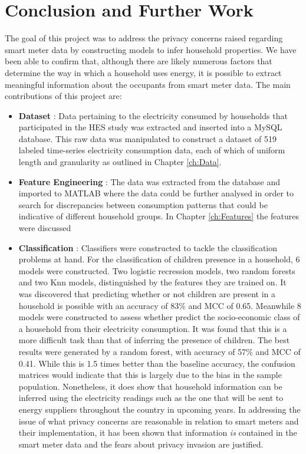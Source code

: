 \chapter{Conclusion and Further Work}

The goal of this project was to address the privacy concerns raised regarding smart meter data by constructing models to infer household properties. We have been able to confirm that, although there are likely numerous factors that determine the way in which a household uses energy, it is possible to extract meaningful information about the occupants from smart meter data. The main contributions of this project are:

\begin{itemize}

\item \textbf{Dataset} : Data pertaining to the electricity consumed by households that participated in the HES study was extracted and inserted into a MySQL database. This raw data was manipulated to construct a dataset of 519 labeled time-series electricity consumption data, each of which of uniform length and granularity as outlined in Chapter \ref{ch:Data}. 

\item \textbf{Feature Engineering} : The data was extracted from the database and imported to MATLAB where the data could be further analysed in order to search for discrepancies between consumption patterns that could be indicative of different household groups. In Chapter \ref{ch:Features} the features were discussed 

\item \textbf{Classification} : Classifiers were constructed to tackle the classification problems at hand. For the classification of children presence in a household, 6 models were constructed. Two logistic recression models, two random forests and two Knn models, distinguished by the features they are trained on. It was discovered that predicting whether or not children are present in a household is possible with an accuracy of 83\% and MCC of 0.65. Meanwhile 8 models were constructed to assess whether predict the socio-economic class of a household from their electricity consumption. It was found that this is a more difficult task than that of inferring the presence of children. The best results were generated by a random forest, with accuracy of 57\% and MCC of 0.41. While this is 1.5 times better than the baseline accuracy, the confusion matrices would indicate that this is largely due to the bias in the sample population. Nonetheless, it does show that household information can be inferred using the electricity readings such as the one that will be sent to energy suppliers throughout the country in upcoming years. In addressing the issue of what privacy concerns are reasonable in relation to smart meters and their implementation, it has been shown that information \textit{is} contained in the smart meter data and the fears about privacy invasion are justified.
\end{itemize}

